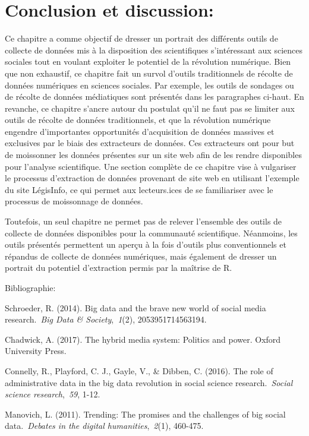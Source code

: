 \documentclass[
  letterpaper,
  DIV=11,
  numbers=noendperiod]{scrreprt}
\begin{document}
\hfill\break

\section{Conclusion et discussion:}\label{conclusion-et-discussion}

Ce chapitre a comme objectif de dresser un portrait des différents
outils de collecte de données mis à la disposition des scientifiques
s'intéressant aux sciences sociales tout en voulant exploiter le
potentiel de la révolution numérique. Bien que non exhaustif, ce
chapitre fait un survol d'outils traditionnels de récolte de données
numériques en sciences sociales. Par exemple, les outils de sondages ou
de récolte de données médiatiques sont présentés dans les paragraphes
ci-haut. En revanche, ce chapitre s'ancre autour du postulat qu'il ne
faut pas se limiter aux outils de récolte de données traditionnels, et
que la révolution numérique engendre d'importantes opportunités
d'acquisition de données massives et exclusives par le biais des
extracteurs de données. Ces extracteurs ont pour but de moissonner les
données présentes sur un site web afin de les rendre disponibles pour
l'analyse scientifique. Une section complète de ce chapitre vise à
vulgariser le processus d'extraction de données provenant de site web en
utilisant l'exemple du site LégisInfo, ce qui permet aux lecteurs.ices
de se familiariser avec le processus de moissonnage de données.

Toutefois, un seul chapitre ne permet pas de relever l'ensemble des
outils de collecte de données disponibles pour la communauté
scientifique. Néanmoins, les outils présentés permettent un aperçu à la
fois d'outils plus conventionnels et répandus de collecte de données
numériques, mais également de dresser un portrait du potentiel
d'extraction permis par la maîtrise de R.

Bibliographie:

Schroeder, R. (2014). Big data and the brave new world of social media
research.~\emph{Big Data \& Society},~\emph{1}(2), 2053951714563194.

Chadwick, A. (2017). The hybrid media system: Politics and power. Oxford
University Press.

Connelly, R., Playford, C. J., Gayle, V., \& Dibben, C. (2016). The role
of administrative data in the big data revolution in social science
research.~\emph{Social science research},~\emph{59}, 1-12.

Manovich, L. (2011). Trending: The promises and the challenges of big
social data.~\emph{Debates in the digital humanities},~\emph{2}(1),
460-475.
\end{document}
